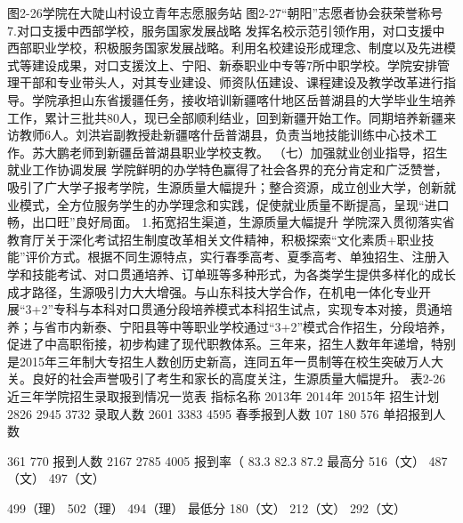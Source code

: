    图2-26学院在大陡山村设立青年志愿服务站  图2-27“朝阳”志愿者协会获荣誉称号
7.对口支援中西部学校，服务国家发展战略
发挥名校示范引领作用，对口支援中西部职业学校，积极服务国家发展战略。利用名校建设形成理念、制度以及先进模式等建设成果，对口支援汶上、宁阳、新泰职业中专等7所中职学校。学院安排管理干部和专业带头人，对其专业建设、师资队伍建设、课程建设及教学改革进行指导。学院承担山东省援疆任务，接收培训新疆喀什地区岳普湖县的大学毕业生培养工作，累计三批共80人，现已全部顺利结业，回到新疆开始工作。同期培养新疆来访教师6人。刘洪岩副教授赴新疆喀什岳普湖县，负责当地技能训练中心技术工作。苏大鹏老师到新疆岳普湖县职业学校支教。
（七）加强就业创业指导，招生就业工作协调发展
学院鲜明的办学特色赢得了社会各界的充分肯定和广泛赞誉，吸引了广大学子报考学院，生源质量大幅提升；整合资源，成立创业大学，创新就业模式，全方位服务学生的办学理念和实践，促使就业质量不断提高，呈现“进口畅，出口旺”良好局面。
1.拓宽招生渠道，生源质量大幅提升
学院深入贯彻落实省教育厅关于深化考试招生制度改革相关文件精神，积极探索“文化素质+职业技能”评价方式。根据不同生源特点，实行春季高考、夏季高考、单独招生、注册入学和技能考试、对口贯通培养、订单班等多种形式，为各类学生提供多样化的成长成才路径，生源吸引力大大增强。与山东科技大学合作，在机电一体化专业开展“3+2”专科与本科对口贯通分段培养模式本科招生试点，实现专本对接，贯通培养；与省市内新泰、宁阳县等中等职业学校通过“3+2”模式合作招生，分段培养，促进了中高职衔接，初步构建了现代职教体系。三年来，招生人数年年递增，特别是2015年三年制大专招生人数创历史新高，连同五年一贯制等在校生突破万人大关。良好的社会声誉吸引了考生和家长的高度关注，生源质量大幅提升。
表2-26近三年学院招生录取报到情况一览表
指标名称
2013年
2014年
2015年
招生计划
2826
2945
3732
录取人数
2601
3383
4595
春季报到人数
107
180
576
单招报到人数

361
770
报到人数
2167
2785
4005
报到率（%
83.3
82.3
87.2
最高分
516（文）
487（文）
497（文）

499（理）
502（理）
494（理）
最低分
180（文）
212（文）
292（文）

